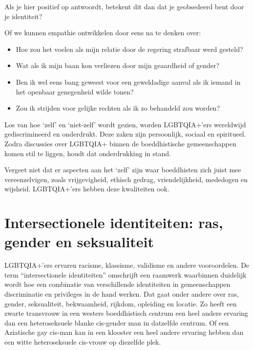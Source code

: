 \documentclass[12pt,openany]{book}
\begin{document}
Als je hier positief op antwoordt, betekent dit dan dat je geobsedeerd bent door je identiteit?

Of we kunnen empathie ontwikkelen door eens na te denken over:

\begin{itemize}
\setlength\itemsep{-0.3em}
\item Hoe zou het voelen als mijn relatie door de regering strafbaar werd gesteld?
\item Wat als ik mijn baan kon verliezen door mijn geaardheid of gender?
\item Ben ik wel eens bang geweest voor een geweldadige aanval als ik iemand in het openbaar genegenheid wilde tonen?
\item Zou ik strijden voor gelijke rechten als ik zo behandeld zou worden?
\end{itemize}

Los van hoe ‘zelf’ en ‘niet-zelf’ wordt gezien, worden \mbox{LGBTQIA+’ers} wereldwijd gediscrimineerd en onderdrukt. Deze zaken zijn persoonlijk, sociaal en spiritueel. Zodra discussies over LGBTQIA+ binnen de boeddhistische gemeenschappen komen stil te liggen, houdt dat onderdrukking in stand.

Vergeet niet dat er aspecten aan het ‘zelf’ zijn waar boeddhisten zich juist mee vereenzelvigen, zoals vrijgevigheid, ethisch gedrag, vriendelijkheid, mededogen en wijsheid. LGBTQIA+’ers hebben deze kwaliteiten ook.

\section*{Intersectionele identiteiten: ras, gender en seksualiteit}

LGBTQIA+’ers ervaren racisme, klassisme, validisme en andere vooroordelen. De term “intersectionele identiteiten” omschrijft een raamwerk waarbinnen duidelijk wordt hoe een combinatie van verschillende identiteiten in gemeenschappen discriminatie en privileges in de hand werken. Dat gaat onder andere over ras, gender, seksualiteit, bekwaamheid, rijkdom, opleiding en locatie. Zo heeft een zwarte transvrouw in een westers boeddhistisch centrum een heel andere ervaring dan een heteroseksuele blanke cis-gender man in datzelfde centrum. Of een Aziatische gay cis-man kan in een klooster een heel andere ervaring hebben dan een witte heteroseksuele cis-vrouw op diezelfde plek.
\end{document}
